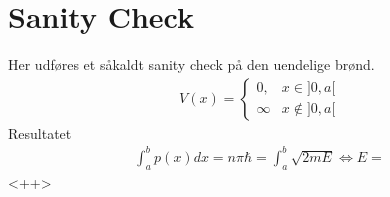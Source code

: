 \section{Sanity Check}
Her udføres et såkaldt sanity check på den uendelige brønd.
\begin{align}
    V(x) =
    \begin{cases}
    0, & x\in]0, a[ \\
    \infty & x\nin]0, a[
    \end{cases}
    \label{pot}
\end{align}
Resultatet
\begin{align}
    \int_{a}^{b} p(x) dx = n\pi \hbar = \int_{a}^{b} \sqrt{2mE}
    \Leftrightarrow E =
    \label{<+label+>}
\end{align}<++>

